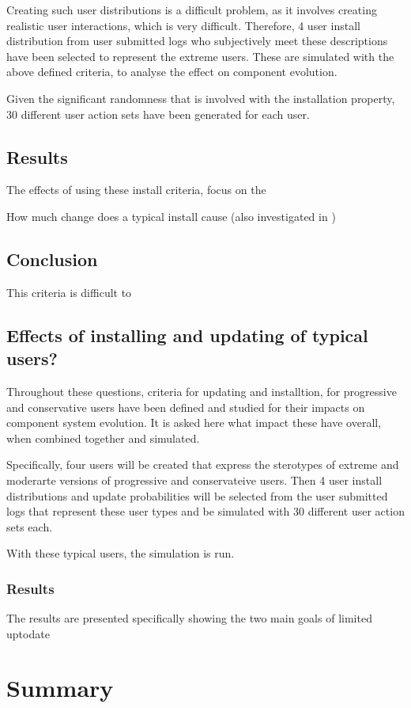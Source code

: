 Creating such user distributions is a difficult problem, as it involves creating realistic user interactions, which is very difficult.
Therefore, 4 user install distribution from user submitted logs who subjectively meet these descriptions have been selected to represent the extreme users.
These are simulated with the above defined criteria, to analyse the effect on component evolution.

Given the significant randomness that is involved with the installation property, 30 different user action sets have been generated for each user.


\subsection{Results}
The effects of using these install criteria, focus on the 

How much change does a typical install cause (also investigated in \cite{Jenson2010})

\subsection{Conclusion}
This criteria is difficult to 

\subsection{Effects of installing and updating of typical users?}
Throughout these questions, criteria for updating and installtion, for progressive and conservative users have been defined and studied for their impacts on component system evolution.
It is asked here what impact these have overall, when combined together and simulated.

Specifically, four users will be created that express the sterotypes of extreme and moderarte versions of progressive and conservateive users.
Then 4 user install distributions and update probabilities will be selected from the user submitted logs that represent these user types and be simulated with 30 different user action sets each.

With these typical users, the simulation is run.
\subsubsection{Results}
The results are presented specifically showing the two main goals of limited uptodate

\section{Summary}
